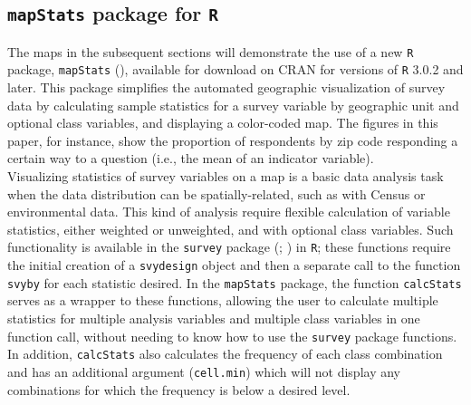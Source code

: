 \subsection{\texttt{mapStats} package for \texttt{R}}

The maps in the subsequent sections will demonstrate the use of a new \texttt{R} package, \texttt{mapStats} (\citealt{mapStats}), available for download on CRAN for versions of \texttt{R} 3.0.2 and later.  This package simplifies the automated geographic visualization of survey data by calculating sample statistics for a survey variable by geographic unit and optional class variables, and displaying a color-coded map.  The figures in this paper, for instance, show the proportion of respondents by zip code responding a certain way to a question (i.e., the mean of an indicator variable). \\
\indent
Visualizing statistics of survey variables on a map is a basic data analysis task when the data distribution can be spatially-related, such as with Census or environmental data.  This kind of analysis require flexible calculation of variable statistics, either weighted or unweighted, and with optional class variables.  Such functionality is available in the \texttt{survey} package (\citealt{SPack}; \citealt{SArt}) in \texttt{R}; these functions require the initial creation of a \texttt{svydesign} object and then a separate call to the function \texttt{svyby} for each statistic desired.  In the \texttt{mapStats} package, the function \texttt{calcStats} serves as a wrapper to these functions, allowing the user to calculate multiple statistics for multiple analysis variables and multiple class variables in one function call, without needing to know how to use the \texttt{survey} package functions.  In addition, \texttt{calcStats} also calculates the frequency of each class combination and has an additional argument (\texttt{cell.min}) which will not display any combinations for which the frequency is below a desired level. \\
\indent
